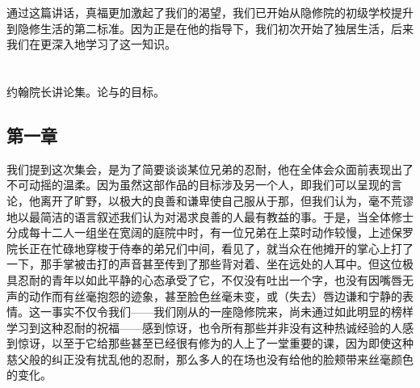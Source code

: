 通过这篇讲话，真福更加激起了我们的渴望，我们已开始从隐修院的初级学校提升到隐修生活的第二标准。因为正是在他的指导下，我们初次开始了独居生活，后来我们在更深入地学习了这一知识。\par



\section{}

\par

约翰院长讲论集。论与的目标。\par


\subsection{第一章}

\par

我们提到这次集会，是为了简要谈谈某位兄弟的忍耐，他在全体会众面前表现出了不可动摇的温柔。因为虽然这部作品的目标涉及另一个人，即我们可以呈现的言论，他离开了旷野，以极大的良善和谦卑使自己服从于那，但我们认为，毫不荒谬地以最简洁的语言叙述我们认为对渴求良善的人最有教益的事。于是，当全体修士分成每十二人一组坐在宽阔的庭院中时，有一位兄弟在上菜时动作较慢，上述保罗院长正在忙碌地穿梭于侍奉的弟兄们中间，看见了，就当众在他摊开的掌心上打了一下，那手掌被击打的声音甚至传到了那些背对着、坐在远处的人耳中。但这位极具忍耐的青年以如此平静的心态承受了它，不仅没有吐出一个字，也没有因嘴唇无声的动作而有丝毫抱怨的迹象，甚至脸色丝毫未变，或（失去）唇边谦和宁静的表情。这一事实不仅令我们——我们刚从的一座隐修院来，尚未通过如此明显的榜样学习到这种忍耐的祝福——感到惊讶，也令所有那些并非没有这种热诚经验的人感到惊讶，以至于它给那些甚至已经很有修为的人上了一堂重要的课，因为即使这种慈父般的纠正没有扰乱他的忍耐，那么多人的在场也没有给他的脸颊带来丝毫颜色的变化。\par

